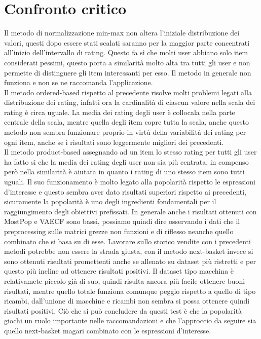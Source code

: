 \section{Confronto critico}
Il metodo di normalizzazione min-max non altera l'iniziale distribuzione dei valori, questi dopo essere stati scalati saranno per la maggior parte concentrati all'inizio dell'intervallo di rating. Questo fa sì che molti user abbiano solo item considerati pessimi, questo porta a similarità molto alta tra tutti gli user e non permette di distinguere gli item interessanti per esso. Il metodo in generale non funziona e non se ne raccomanda l'applicazione.\\
Il metodo ordered-based rispetto al precedente risolve molti problemi legati alla distribuzione dei rating, infatti ora la cardinalità di ciascun valore nella scala dei rating è circa uguale. La media dei rating degli user è collocala nella parte centrale della scala, mentre quella degli item copre tutta la scala, anche questo metodo non sembra funzionare proprio in virtù della variabilità dei rating per ogni item, anche se i risultati sono leggermente migliori dei precedenti.\\
Il metodo product-based assegnando ad un item lo stesso rating per tutti gli user ha fatto si che la media dei rating degli user non sia più centrata, in compenso però nella similarità è aiutata in quanto i rating di uno stesso item sono tutti uguali. Il suo funzionamento è molto legato alla popolarità rispetto le espressioni d'interesse e questo sembra aver dato risultati superiori rispetto ai precedenti, sicuramente la popolarità è uno degli ingredienti fondamentali per il raggiungimento degli obiettivi prefissati. In generale anche i risultati ottenuti con MostPop e VAECF sono bassi, possiamo quindi dire osservando i dati che il preprocessing sulle matrici grezze non funzioni e di riflesso neanche quello combinato che si basa su di esse. Lavorare sullo storico vendite con i precedenti metodi potrebbe non essere la strada giusta, con il metodo next-basket invece si sono ottenuti risultati promettenti anche se allenato su dataset più ristretti e per questo più incline ad ottenere risultati positivi. Il dataset tipo macchina è relativamete piccolo già di suo, quindi risulta ancora più facile ottenere buoni risultati, mentre quello totale funziona comunque peggio rispetto a quello di tipo ricambi, dall'unione di macchine e ricambi non sembra si possa ottenere quindi risultati positivi.
Ciò che si può concludere da questi test è che la popolarità giochi un ruolo importante nelle raccomandazioni e che l'approccio da seguire sia quello next-basket magari combinato con le espressioni d'interesse.
